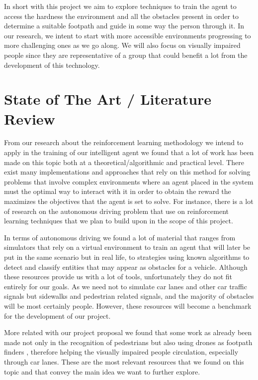 \documentclass[letterpaper,10pt]{article}
\begin{document}
In short with this project we aim to explore techniques to train the agent to 
access the hardness the environment and all the obstacles present in order
to determine a suitable footpath and guide in some way the person through it.
In our research, we intent to start with more accessible environments 
progressing to more challenging ones as we go along. We will also focus 
on visually impaired people since they are representative of a group that
could benefit a lot from the development of this technology.

\section{State of The Art / Literature Review}

From our research about the reinforcement learning methodology \cite{sutton}
we intend to apply in the training of our intelligent agent we found that a 
lot of work has been made on this topic both at a theoretical/algorithmic
\cite{MARL:overview,DBLP:journals/corr/abs-1911-10635}
and practical level. There exist many implementations and approaches that 
rely on this method for solving problems that involve complex environments 
where an agent placed in the system must the optimal way to interact with 
it in order to obtain the reward the maximizes the objectives that the agent 
is set to solve. For instance, there is a lot of research on the autonomous 
driving problem that use on reinforcement learning techniques that we plan 
to build upon in the scope of this project. 

In terms of autonomous driving we found a lot of material that ranges from 
simulators \cite{duckietown-library} that rely on a virtual environment to 
train an agent that will later be put in the same scenario but in real 
life, to strategies using known algorithms \cite{vieira2021openworld} to 
detect and classify entities that may appear as obstacles for a vehicle.
Although these resources provide us with a lot of tools, unfortunately they 
do not fit entirely for our goals. As we need not to simulate car lanes and 
other car traffic signals but sidewalks and pedestrian related signals, and 
the majority of obstacles will be most certainly people. However, these 
resources will become a benchmark for the development of our project.

More related with our project proposal we found that some work as already
been made not only in the recognition of pedestrians \cite{dataflair_2021}
but also using drones as footpath finders \cite{tan2021flying}, 
therefore helping the visually impaired people circulation, especially 
through car lanes. These are the most relevant resources that we found on 
this topic and that convey the main idea we want to further explore.
\end{document}
